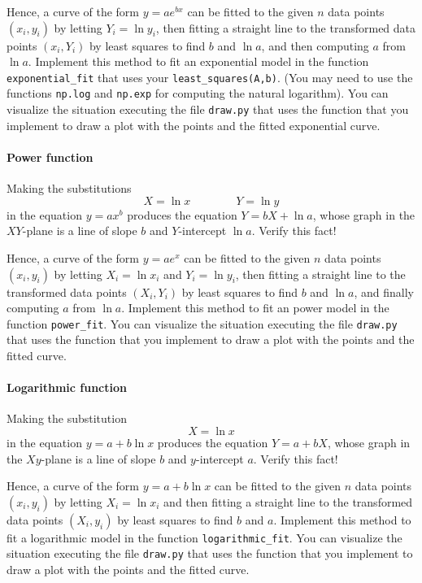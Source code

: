 \documentclass[a4paper,10pt]{article}
\begin{document}
Hence, a curve of the form $y=ae^{bx}$ can be fitted to the given $n$ data
points $(x_i,y_i)$ by letting $Y_i=\ln y_i$, then fitting a straight
line to the transformed data points $(x_i,Y_i)$ by least squares to find
$b$ and $\ln a$, and then computing $a$ from $\ln a$.  Implement this
method to fit an exponential model in the function
\lstinline{exponential_fit} that uses your
\lstinline{least_squares(A,b)}. (You may need to use the functions
\lstinline{np.log} and \lstinline{np.exp} for computing the natural
logarithm). You can visualize the situation executing the file
\lstinline{draw.py} that uses the function that you implement to draw a
plot with the points and the fitted exponential curve.

\paragraph{Power function}
Making the substitutions \[X=\ln x\qquad \qquad Y=\ln y\] in the
equation $y=ax^b$ produces the equation $Y=bX+\ln a$, whose graph in the
$XY$-plane is a line of slope $b$ and $Y$-intercept $\ln a$.  Verify
this fact!

Hence, a curve of the form $y=ae^x$ can be fitted to the given $n$ data
points $(x_i,y_i)$ by letting $X_i=\ln x_i$ and $Y_i=\ln y_i$, then
fitting a straight line to the transformed data points $(X_i,Y_i)$ by
least squares to find $b$ and $\ln a$, and finally computing $a$ from $\ln
a$.  Implement this method to fit an power model in the function
\lstinline{power_fit}. You can visualize the situation executing the
file \lstinline{draw.py} that uses the function that you implement to
draw a plot with the points and the fitted curve.


\paragraph{Logarithmic function} Making the substitution \[X=\ln x\]
in the equation $y=a+b\ln x$ produces the equation $Y=a+bX$, whose
graph in the $Xy$-plane is a line of slope $b$ and $y$-intercept
$a$. Verify this fact!

Hence, a curve of the form $y=a+b\ln x$ can be fitted to the given $n$ data
points $(x_i,y_i)$ by letting $X_i=\ln x_i$ and then fitting a straight
line to the transformed data points $(X_i,y_i)$ by least squares to find
$b$ and $a$.  Implement this
method to fit a logarithmic model in the function
\lstinline{logarithmic_fit}. You can visualize the situation executing
the file \lstinline{draw.py} that uses the function that you implement
to draw a plot with the points and the fitted curve.
\end{document}
